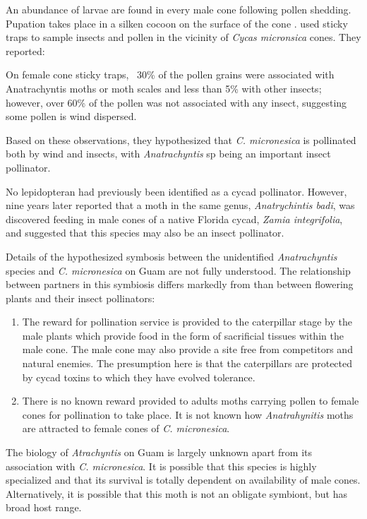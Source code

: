 \documentclass[12pt,letterpaper,english,bibliography=totocnumbered, abstract=on]{scrartcl}
\begin{document}
An abundance of larvae are found in every
male cone following pollen shedding. Pupation takes place in a silken cocoon on the surface of the cone \parencite{marlerPestsCycasMicronesica2006}.
\cite{terryConeInsectsPutative2009} used sticky traps to sample insects and pollen in the vicinity of \textit{Cycas micronsica} cones. They reported:

\begin{displayquote}
	On female cone sticky traps, ~30\% of the
	pollen grains were associated with Anatrachyntis moths or moth scales
	and less than 5\% with other insects; however, over 60\% of the pollen
	was not associated with any insect, suggesting some pollen is wind
	dispersed.
\end{displayquote}

Based on these observations, they hypothesized that \textit{C. micronesica} is pollinated both by wind and insects, with \textit{Anatrachyntis} sp being an important insect pollinator.

No lepidopteran had previously been identified as a cycad pollinator. However, nine years later \cite{huaFirstRecordAnatrachyntis2018} reported that a moth in the same genus, \textit{Anatrychintis badi}, was discovered feeding in male cones of a native Florida cycad, \textit{Zamia integrifolia}, and suggested that this species may also be an insect pollinator.

Details of the hypothesized symbosis between the unidentified \textit{Anatrachyntis} species and \textit{C. micronesica} on Guam are not fully understood. The relationship between partners in this symbiosis differs markedly from than between flowering plants and their insect pollinators:
\begin{enumerate}
	\item The reward for pollination service is provided to the caterpillar stage by the male plants which provide food in the form of sacrificial tissues within the male cone. The male cone may also provide a site free from competitors and natural enemies. The presumption here is that the caterpillars are protected by cycad toxins to which they have evolved tolerance.
	\item There is no known reward provided to adults moths carrying pollen to female cones for pollination to take place. It is not known how \textit{Anatrahynitis} moths are attracted to female cones of \textit{C. micronesica}. 
\end{enumerate}

The biology of \textit{Atrachyntis} on Guam is largely unknown apart from its association with \textit{C. micronesica}. It is possible that this species is highly specialized and that its survival is totally dependent on availability of male cones. Alternatively, it is possible that this moth is not an obligate symbiont, but has broad host range.  
\end{document}
